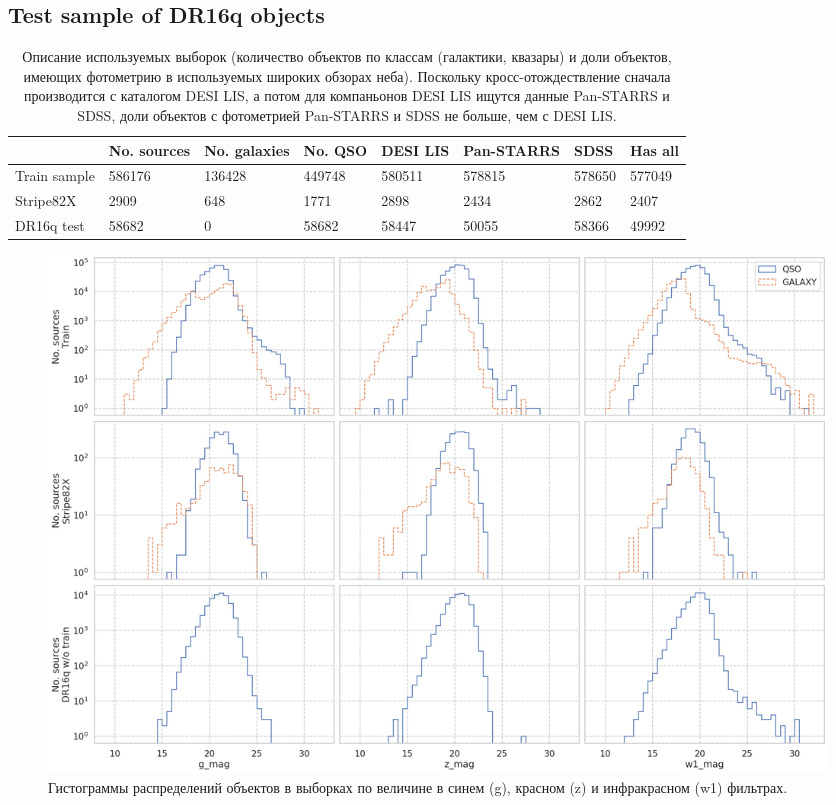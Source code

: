 \documentclass[fleqn,usenatbib]{mnras}
\begin{document}
\subsection{Test sample of DR16q objects}
\begin{table}
	\begin{tabular}{llllllll}
            \hline
            {} & No. sources & No. galaxies & No. QSO & DESI LIS & Pan-STARRS &    SDSS & Has all \\
            \hline
            Train sample &      586176 &       136428 &  449748 &   580511 &     578815 &  578650 &  577049 \\
            Stripe82X    &        2909 &          648 &    1771 &     2898 &       2434 &    2862 &    2407 \\
            DR16q test   &       58682 &            0 &   58682 &    58447 &      50055 &   58366 &   49992 \\
            \hline
            \end{tabular}
            \caption{Описание используемых выборок (количество объектов по классам (галактики, квазары) и доли объектов, имеющих фотометрию в используемых широких обзорах неба). Поскольку кросс-отождествление сначала производится с каталогом DESI LIS, а потом для компаньонов DESI LIS ищутся данные Pan-STARRS и SDSS, доли объектов с фотометрией Pan-STARRS и SDSS не больше, чем с DESI LIS.}
\end{table}

\begin{figure}
    \centering
    \includegraphics[width=0.9\linewidth]{images/data-dist-mags.png}
    \caption{Гистограммы распределений объектов в выборках по величине в синем (g), красном (z) и инфракрасном (w1) фильтрах.}
    \label{fig:my_label}
\end{figure}
\end{document}
